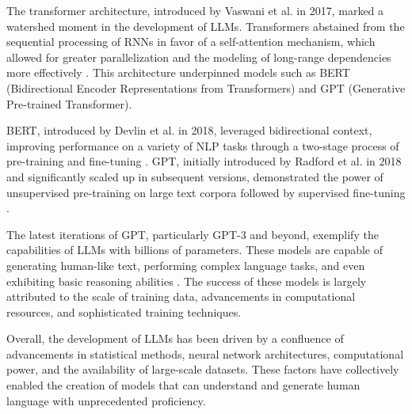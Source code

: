 The transformer architecture, introduced by Vaswani et al. in 2017, marked a watershed moment in the development of LLMs. Transformers abstained from the sequential processing of RNNs in favor of a self-attention mechanism, which allowed for greater parallelization and the modeling of long-range dependencies more effectively \cite{vaswani2017attention}. This architecture underpinned models such as BERT (Bidirectional Encoder Representations from Transformers) and GPT (Generative Pre-trained Transformer).

BERT, introduced by Devlin et al. in 2018, leveraged bidirectional context, improving performance on a variety of NLP tasks through a two-stage process of pre-training and fine-tuning \cite{devlin2018bert}. GPT, initially introduced by Radford et al. in 2018 and significantly scaled up in subsequent versions, demonstrated the power of unsupervised pre-training on large text corpora followed by supervised fine-tuning \cite{Radford2018ImprovingLU}.

The latest iterations of GPT, particularly GPT-3 and beyond, exemplify the capabilities of LLMs with billions of parameters. These models are capable of generating human-like text, performing complex language tasks, and even exhibiting basic reasoning abilities \cite{brown2020language}. The success of these models is largely attributed to the scale of training data, advancements in computational resources, and sophisticated training techniques.

Overall, the development of LLMs has been driven by a confluence of advancements in statistical methods, neural network architectures, computational power, and the availability of large-scale datasets. These factors have collectively enabled the creation of models that can understand and generate human language with unprecedented proficiency.
